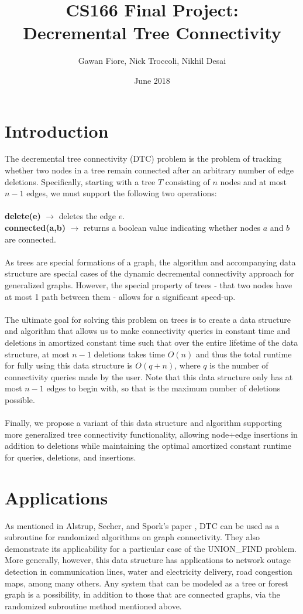 \documentclass{article}
\title{CS166 Final Project: \\ Decremental Tree Connectivity}
\author{Gawan Fiore, Nick Troccoli, Nikhil Desai}
\date{June 2018}
\begin{document}
\maketitle

\section{Introduction}
The decremental tree connectivity (DTC) problem is the problem of tracking whether two nodes in a tree remain connected after an arbitrary number of edge deletions.  Specifically, starting with a tree $T$ consisting of $n$ nodes and at most $n-1$ edges, we must support the following two operations: \\ \\
\textbf{delete(e)} $\rightarrow$ deletes the edge $e$. \\
\textbf{connected(a,b)} $\rightarrow$ returns a boolean value indicating whether nodes $a$ and $b$ are connected. \\ \\
As trees are special formations of a graph, the algorithm and accompanying data structure are special cases of the dynamic decremental connectivity approach for generalized graphs. However, the special property of trees - that two nodes have at most 1 path between them - allows for a significant speed-up. \\ \\
The ultimate goal for solving this problem on trees is to create a data structure and algorithm that allows us to make connectivity queries in constant time and deletions in amortized constant time such that over the entire lifetime of the data structure, at most $n-1$ deletions takes time $O(n)$ and thus the total runtime for fully using this data structure is $O(q + n)$, where $q$ is the number of connectivity queries made by the user. Note that this data structure only has at most $n-1$ edges to begin with, so that is the maximum number of deletions possible. \\ \\
Finally, we propose a variant of this data structure and algorithm supporting more generalized tree connectivity functionality, allowing node+edge insertions in addition to deletions while maintaining the optimal amortized constant runtime for queries, deletions, and insertions.

\section{Applications}
As mentioned in Alstrup, Secher, and Spork's paper \cite{ALSTRUP1997161}, DTC can be used as a subroutine for randomized algorithms on graph connectivity. They also demonstrate its applicability for a particular case of the UNION\_FIND problem. More generally, however, this data structure has applications to network outage detection in communication lines, water and electricity delivery, road congestion maps, among many others. Any system that can be modeled as a tree or forest graph is a possibility, in addition to those that are connected graphs, via the randomized subroutine method mentioned above. \\
\end{document}
